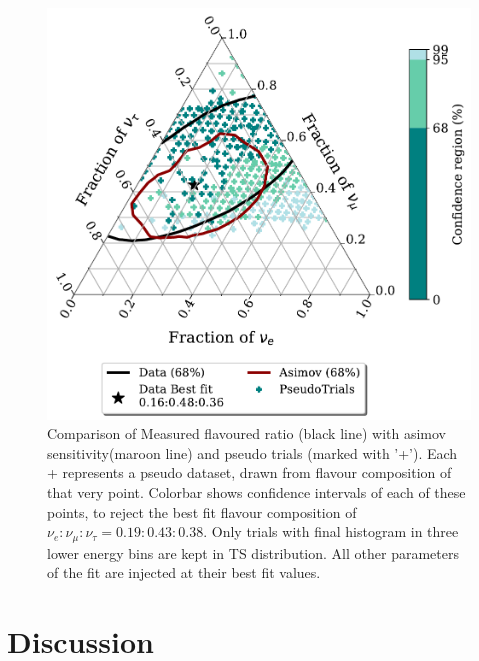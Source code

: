 \begin{figure}[h]
    
    \includegraphics{./figures/results/PE_data_asimov_68_BkgOnly.pdf}


    \caption{Comparison of Measured flavoured ratio (black line) with asimov sensitivity(maroon line) and pseudo trials (marked with '+'). Each + represents a pseudo dataset, drawn from flavour composition of that very point. Colorbar shows confidence intervals of each of these points, to reject the best fit flavour composition of $\nu_e:\nu_{\mu}:\nu_{\tau} = 0.19:0.43:0.38$. Only trials with final histogram in three lower energy bins are kept in TS distribution. All other parameters of the fit are injected at their best fit values.}
\end{figure}

\section{Discussion}
\label{sec:results_discussion}

